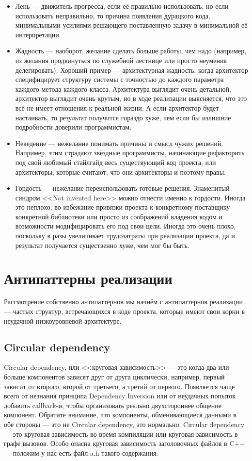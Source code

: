 \documentclass[a5paper]{article}
\begin{document}
\begin{itemize}
    \item Лень --- движитель прогресса, если её правильно использовать, но если использовать неправильно, то причина появления дурацкого кода, минимальными усилиями решающего поставленную задачу в минимальной её интерпретации.
    \item Жадность --- наоборот, желание сделать больше работы, чем надо (например, из желания продвинуться по служебной лестнице или просто неумения делегировать). Хороший пример --- архитектурная жадность, когда архитектор специфицирует структуру системы с точностью до каждого параметра каждого метода каждого класса. Архитектура выглядит очень детальной, архитектор выглядит очень крутым, но в ходе реализации выясняется, что это всё не имеет отношения к реальной жизни. А если архитектор будет настаивать, то результат получится гораздо хуже, чем если бы излишние подробности доверили программистам.
    \item Неведение --- нежелание понимать причины и смысл чужих решений. Например, этим страдают звёздные программисты, начинающие рефакторить под свой любимый стайлгайд весь существующий код проекта, или архитекторы, которые считают, что они архитекторы и поэтому правы.
    \item Гордость --- нежелание переиспользовать готовые решения. Знаменитый синдром <<Not invented here>> можно отнести именно к гордости. Иногда это неплохо, во избежание привязки проекта к конкретному поставщику конкретной библиотеки или просто из соображений владения кодом и возможности модифицировать его под свои цели. Иногда это очень плохо, поскольку в разы увеличивает трудозатраты при реализации проекта, да и результат получается существенно хуже, чем мог бы быть.
\end{itemize}

\section{Антипаттерны реализации}

Рассмотрение собственно антипаттернов мы начнём с антипаттернов реализации --- частых структур, встречающихся в коде проекта, которые имеют свои корни в неудачной низкоуровневой архитектуре.

\subsection{Circular dependency}

Circular dependency, или <<круговая зависимость>> --- это когда два или больше компонентов зависят друг от друга циклически, например, первый зависит от второго, второй от третьего, а третий от первого. Появляется чаще всего от незнания принципа Dependency Inversion или от неудачных попыток добавить callback-и, чтобы организовать реально двухстороннее общение компонент. Обратите внимание, что компоненты, обменивающиеся данными в обе стороны --- это не Circular dependency, это нормально. Circular dependency --- это круговая зависимость во время компиляции или круговая зависимость в графе вызовов. Особо опасна круговая зависимость заголовочных файлов в C++ --- положим у нас есть файл a.h такого содержания:
\end{document}
